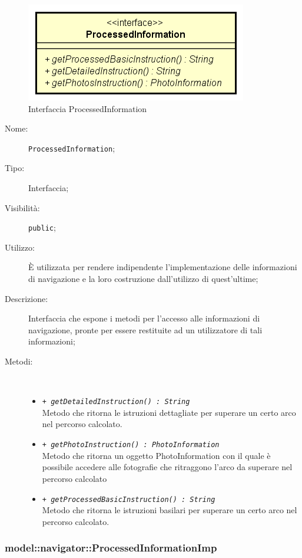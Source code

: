 \documentclass[../DefinizioneDiProdotto.tex]{subfiles}
\begin{document}
    \begin{figure}[H]
        \centering
        \includegraphics{img/ProcessedInformation.png}
        \caption{Interfaccia ProcessedInformation}\label{fig:model::navigator::ProcessedInformation} 
    \end{figure}
    \begin{description}
\item[Nome:] \texttt{ProcessedInformation};
\item[Tipo:] Interfaccia;
\item[Visibilità:] \texttt{public};
\item[Utilizzo:] È utilizzata per rendere indipendente l'implementazione delle informazioni di navigazione e la loro costruzione dall'utilizzo di quest'ultime;
\item[Descrizione:] Interfaccia che espone i metodi per l'accesso alle informazioni di navigazione, pronte per essere restituite ad un utilizzatore di tali informazioni;
\item[Metodi:] \
\begin{itemize}
\item \texttt{+ \textit{getDetailedInstruction() : String}}\\
Metodo che ritorna le istruzioni dettagliate per superare un certo arco nel percorso calcolato.
 \item \texttt{+ \textit{getPhotoInstruction() : PhotoInformation}}\\
Metodo che ritorna un oggetto PhotoInformation con il quale è possibile accedere alle fotografie che ritraggono l'arco da superare nel percorso calcolato
 \item \texttt{+ \textit{getProcessedBasicInstruction() : String}}\\
Metodo che ritorna le istruzioni basilari per superare un certo arco nel percorso calcolato.
 \end{itemize}
\end{description}

\subsubsection{model::navigator::ProcessedInformationImp}
\end{document}
